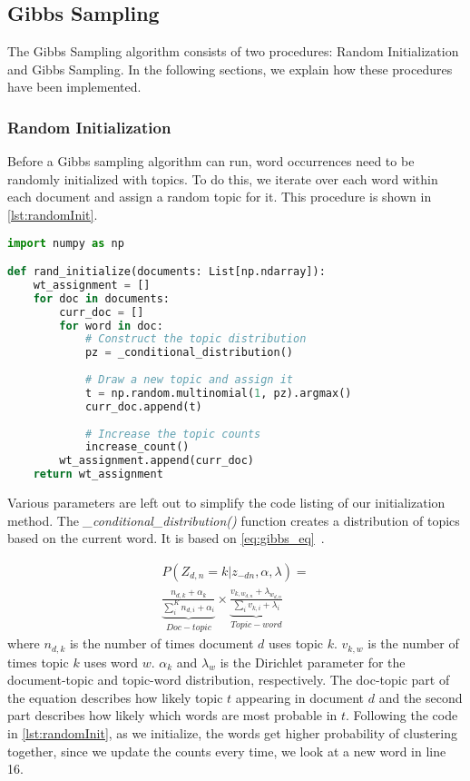 \subsection{Gibbs Sampling}\label{sec:appendix_gibbs}
The Gibbs Sampling algorithm consists of two procedures: Random Initialization and Gibbs Sampling.
In the following sections, we explain how these procedures have been implemented.

\subsubsection{Random Initialization}
Before a Gibbs sampling algorithm can run, word occurrences need to be randomly initialized with topics.
To do this, we iterate over each word within each document and assign a random topic for it.
This procedure is shown in \autoref{lst:randomInit}.
\begin{lstlisting}[language=Python, caption=Random Initialization,label={lst:randomInit}]
import numpy as np

def rand_initialize(documents: List[np.ndarray]):
	wt_assignment = []
	for doc in documents:
		curr_doc = []
		for word in doc:
			# Construct the topic distribution
			pz = _conditional_distribution()
			
			# Draw a new topic and assign it
			t = np.random.multinomial(1, pz).argmax()
			curr_doc.append(t)
			
			# Increase the topic counts
			increase_count()
		wt_assignment.append(curr_doc)
	return wt_assignment
\end{lstlisting}

Various parameters are left out to simplify the code listing of our initialization method.
The \emph{\_conditional\_distribution()} function creates a distribution of topics based on the current word.
It is based on \autoref{eq:gibbs_eq}~\cite{author_topic_2012}.

\begin{equation}\label{eq:gibbs_eq}
	\begin{split}
		P(Z_{d,n} = k |z_{-dn}, \alpha, \lambda) = \\
		\underbrace{\frac{n_{d,k} + \alpha_{k}}{\sum_{i}^{K} n_{d,i} + \alpha_i}}_{Doc-topic} \times
		\underbrace{\frac{v_{k, w_{d,n}} + \lambda_{w_{d,n}}}{\sum_{i} v_{k,i} + \lambda_i}}_{Topic-word}
	\end{split}
\end{equation}
where $n_{d,k}$ is the number of times document $d$ uses topic $k$.
$v_{k,w}$ is the number of times topic $k$ uses word $w$.
$\alpha_k$ and $\lambda_w$ is the Dirichlet parameter for the document-topic and topic-word distribution, respectively.
The doc-topic part of the equation describes how likely topic $t$ appearing in document $d$ and the second part describes how likely which words are most probable in $t$.
Following the code in \autoref{lst:randomInit}, as we initialize, the words get higher probability of clustering together, since we update the counts every time, we look at a new word in line 16.

